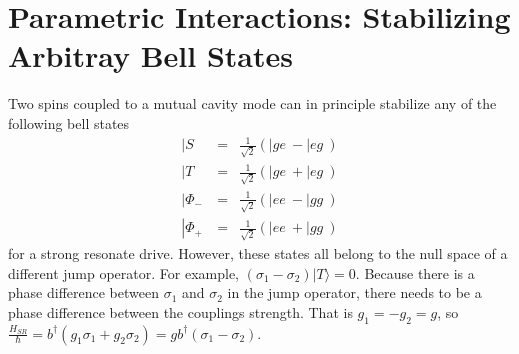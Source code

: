 

\chapter{Parametric Interactions: Stabilizing Arbitray Bell States}

Two spins coupled to a mutual cavity mode can in principle stabilize any of the following bell states
\begin{eqnarray}
\left| S \> & = &  \frac{1}{\sqrt{2}} \left( \left| g e \> - \left| e g\> \right) \nonumber \\
\left| T \> & = &  \frac{1}{\sqrt{2}} \left( \left| g e \> + \left| e g\> \right) \nonumber \\
\left| \Phi_- \> & = &  \frac{1}{\sqrt{2}} \left( \left| e e \> - \left| g g\> \right) \nonumber  \\
\left| \Phi_+ \> & = &  \frac{1}{\sqrt{2}} \left( \left| e e \> + \left| g g\> \right) \nonumber 
\end{eqnarray} 
for a strong resonate drive. However, these states all belong to the null space of a different jump operator. For example, $(\sigma_1 - \sigma_2)|T\rangle = 0 $. Because there is a phase difference between $\sigma_1$ and $\sigma_2$ in the jump operator, there needs to be a phase difference between the couplings strength. That is $g_1 = - g_2 = g$, so $\frac{H_{SR}}{\hbar} = b^\dagger(g_1 \sigma_1 + g_2 \sigma_2 ) = g b^\dagger \left( \sigma_1 - \sigma_2\right)$.

